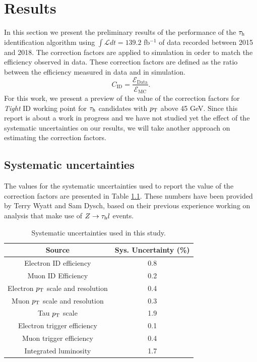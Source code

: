\chapter{Results}\label{chap5}
In this section we present the preliminary results of the performance of the $\tau_\text{h}$ identification algorithm using $\int\mathcal{L} dt=139.2$ fb$^{-1}$ of data recorded between 2015 and 2018.
The correction factors are applied to simulation in order to match the efficiency observed in data. These correction factors are defined as the ratio between the efficiency measured in data and in simulation.
\begin{equation}
C_{\text{ID}}=\frac{\mathcal{E}_{\text{Data}}}{\mathcal{E}_{\text{MC}}}.
\end{equation}
For this work, we present a preview of the value of the correction factors for \textit{Tight} ID working point for $\tau_\text{h}$ candidates with $p_\text{T}$ above 45 GeV. Since this report is about a work in progress and we have not studied yet the effect of the systematic uncertainties on our results, we will take another approach on estimating the correction factors.

\section{Systematic uncertainties}
The values for the systematic uncertainties used to report the value of the correction factors are presented in Table \ref{Tab5}. These numbers have been provided by Terry Wyatt and Sam Dysch, based on their previous experience working on analysis that make use of $Z\to\tau_\text{h} l$ events.
\begin{table}[H]
	\centering
	\begin{tabular}{cc}
		\hline
		\multicolumn{1}{|c|}{Source}        & \multicolumn{1}{c|}{Sys. Uncertainty (\%)} \\ \hline
		Electron ID efficiency              & 0.8                                        \\
		Muon ID Efficiency                  & 0.2                                        \\
		Electron $p_\text{T}$ scale and resolution & 0.4                                        \\
		Muon $p_\text{T}$ scale and resolution     & 0.3                                        \\
		Tau $p_\text{T}$ scale                     & 1.9                                        \\
		Electron trigger efficiency         & 0.1                                        \\
		Muon trigger efficiency             & 0.4                                        \\ 
		Integrated luminosity               & 1.7                                        \\ \hline
	\end{tabular}
	\caption{Systematic uncertainties used in this study.}
	\label{Tab5}
\end{table}
